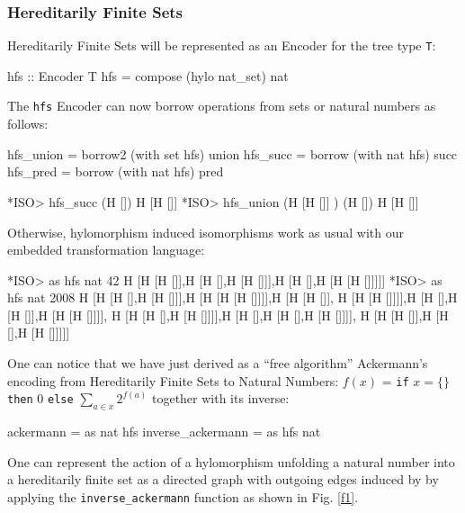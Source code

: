 \documentclass[]{INCLUDES/llncs}
\begin{document}
\subsubsection{Hereditarily Finite Sets}
Hereditarily Finite Sets will be represented
as an Encoder for the tree type {\tt T}:
\begin{code}
hfs :: Encoder T
hfs = compose (hylo nat_set) nat
\end{code}
The {\tt hfs} Encoder can now borrow operations from
sets or natural numbers as follows:
\begin{code}
hfs_union = borrow2 (with set hfs) union
hfs_succ = borrow (with nat hfs) succ
hfs_pred = borrow (with nat hfs) pred
\end{code}
\begin{codex}
*ISO> hfs_succ (H [])
H [H []]
*ISO> hfs_union (H [H []] ) (H [])
H [H []]
\end{codex}
Otherwise, hylomorphism induced isomorphisms
work as usual with our embedded
transformation language:
\begin{codex}
*ISO> as hfs nat 42
H [H [H []],H [H [],H [H []]],H [H [],H [H [H []]]]]
*ISO> as hfs nat 2008
H [H [H [],H [H []]],H [H [H [H []]]],H [H [H []],
   H [H [H []]]],H [H [],H [H []],H [H [H []]]],
   H [H [H [],H [H []]]],H [H [],H [H [],H [H []]]],
   H [H [H []],H [H [],H [H []]]]]
\end{codex}
One can notice that we have just derived as a
``free algorithm'' Ackermann's encoding
\cite{ackencoding,DBLP:journals/tplp/PiazzaP04}
from Hereditarily Finite Sets to Natural Numbers:
\vskip 0.30cm
$f(x)$ = {\tt if} $x=\{\}$ {\tt then} $0$ {\tt else} $\sum_{a \in x}2^{f(a)}$
\vskip 0.30cm
\noindent together with its inverse:
\begin{code}
ackermann = as nat hfs
inverse_ackermann = as hfs nat
\end{code}
One can represent the action of a hylomorphism unfolding a natural number into
a hereditarily finite set as a directed graph with outgoing edges
induced by by applying the {\tt inverse\_ackermann} function as shown
in Fig. \ref{f1}.

\end{document}
